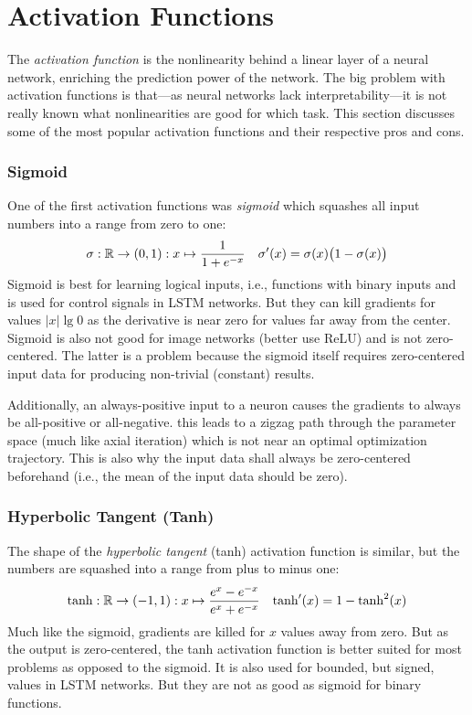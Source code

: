 	\section{Activation Functions}
		\label{sec:activationFunctions}

		The \emph{activation function} is the nonlinearity behind a linear layer of a neural network, enriching the prediction power of the network. The big problem with activation functions is that---as neural networks lack interpretability---it is not really known what nonlinearities are good for which task. This section discusses some of the most popular activation functions and their respective pros and cons.

		\subsubsection{Sigmoid}
			One of the first activation functions was \emph{sigmoid} which squashes all input numbers into a range from zero to one:
			\begin{align}
				\sigma : \mathbb{R} \to (0, 1) : x \mapsto \frac{1}{1 + e^{-x}} &  &
				\sigma'(x) = \sigma(x) \bigl( 1 - \sigma(x) \bigr)
			\end{align}
			Sigmoid is best for learning logical inputs, i.e., functions with binary inputs and is used for control signals in LSTM networks. But they can kill gradients for values \( \lvert x \rvert \lg 0 \) as the derivative is near zero for values far away from the center. Sigmoid is also not good for image networks (better use ReLU) and is not zero-centered. The latter is a problem because the sigmoid itself requires zero-centered input data for producing non-trivial (constant) results.

			Additionally, an always-positive input to a neuron causes the gradients to always be all-positive or all-negative. this leads to a zigzag path through the parameter space (much like axial iteration) which is not near an optimal optimization trajectory. This is also why the input data shall always be zero-centered beforehand (i.e., the mean of the input data should be zero).

		\subsubsection{Hyperbolic Tangent (Tanh)}
			The shape of the \emph{hyperbolic tangent} (tanh) activation function is similar, but the numbers are squashed into a range from plus to minus one:
			\begin{align}
				\tanh : \mathbb{R} \to (-1, 1) : x \mapsto \frac{e^x - e^{-x}}{e^x + e^{-x}} &  &
				\tanh'(x) = 1 - \tanh^2(x)
			\end{align}
			Much like the sigmoid, gradients are killed for \(x\) values away from zero. But as the output is zero-centered, the tanh activation function is better suited for most problems as opposed to the sigmoid. It is also used for bounded, but signed, values in LSTM networks. But they are not as good as sigmoid for binary functions.

